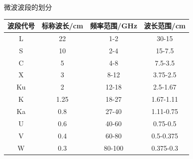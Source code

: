 \documentclass{ctexbeamer}
\begin{document}
\begin{frame}{微波波段的划分}
  \begin{tabular}{cccc}
    \toprule
    波段代号 & 标称波长/cm & 频率范围/GHz & 波长范围/cm \\
    \midrule
     L & 22 & 1-2 & 30-15 \\
     S & 10 & 2-4 & 15-7.5 \\
     C & 5 & 4-8 & 7.5-3.5 \\
     X & 3 & 8-12 & 3.75-2.5 \\
     Ku & 2 & 12-18 & 2.5-1.67 \\
     K & 1.25 & 18-27 & 1.67-1.11 \\
     Ka & 0.8 & 27-40 & 1.11-0.75 \\
     U & 0.6 & 40-60 & 0.75-0.5 \\
     V & 0.4 & 60-80 & 0.5-0.375 \\
     W & 0.3 & 80-100 & 0.375-0.3 \\
     \bottomrule
  \end{tabular}
\end{frame}
\end{document}
